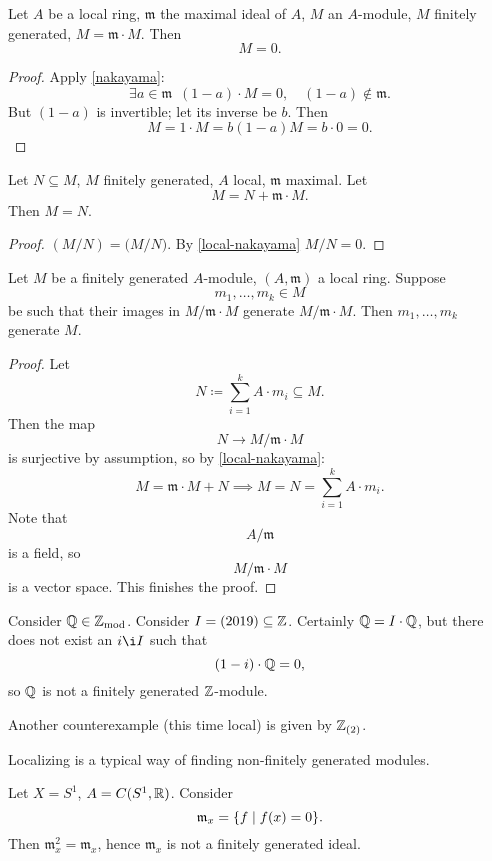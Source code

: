 \begin{corollary}
  \label{local-nakayama}
  Let $A$ be a local ring, $\mathfrak m$ the maximal ideal of $A$, $M$ an $A$-module, $M$ finitely generated, $M = \mathfrak m \cdot M$. Then
  \[ M = 0.\]
\end{corollary}
\begin{proof}
  Apply \cref{nakayama}:
  \[ \exists a \in \mathfrak m \enspace (1-a) \cdot M = 0, \quad (1-a) \notin \mathfrak m.\]
  But $(1 - a)$ is invertible; let its inverse be $b$. Then
  \[ M = 1 \cdot M = b(1-a) M = b \cdot 0 = 0.\]
\end{proof}

\begin{corollary}
  \label{local-nakayama2}
  Let $N \subseteq M$, $M$ finitely generated, $A$ local, $\mathfrak m$ maximal. Let
  \[ M = N + \mathfrak m \cdot M.\]
  Then $M = N$.
\end{corollary}
\begin{proof}
  $(M / {N}) = \mathfrak (M / {N})$.
  By \cref{local-nakayama}
  $M / {N} = 0$.
\end{proof}

\begin{corollary}
  Let $M$ be a finitely generated $A$-module, $(A, \mathfrak m)$ a local ring. Suppose
  \[ m_1, \dotsc, m_k \in M\]
  be such that their images in $M / {\mathfrak m \cdot M}$ generate $M / {\mathfrak m \cdot M}$. Then $m_1, \dotsc, m_k$ generate $M$.
\end{corollary}
\begin{proof}
  Let
  \[ N \coloneqq \sum_{i=1}^k A \cdot m_i \subseteq M.\]
  Then the map
  \[ N \to M / {\mathfrak m \cdot M}\]
  is surjective by assumption, so by \cref{local-nakayama}:
  \[ M = \mathfrak m \cdot M + N \implies M = N = \sum_{i=1}^k A \cdot m_i.\]
  Note that
  \[ A / {\mathfrak m}\]
  is a field, so
  \[ M / {\mathfrak m \cdot M}\]
  is a vector space. This finishes the proof.
\end{proof}

\begin{example}
  Consider $\mathbb Q \in \mathbb Z_\text{mod}$. Consider $I = (2019) \subseteq \mathbb Z$.
  Certainly $\mathbb Q = I \cdot \mathbb Q$, but there does not exist an $i \i I$ such that
  \[ (1-i) \cdot \mathbb Q = 0,\]
  so $\mathbb Q$ is not a finitely generated $\mathbb Z$-module. 
\end{example}

\begin{example}
  Another counterexample (this time local) is given by $\mathbb Z_{(2)}$.
\end{example}

\begin{note}
  Localizing is a typical way of finding non-finitely generated modules.
\end{note}

\begin{example}
  Let $X = S^1$, $A = C(S^1, \mathbb R)$. Consider
  \[ \mathfrak m_x = \{ f \mathrel{|} f(x) = 0 \}. \]
  Then $\mathfrak m_x^2 = \mathfrak m_x$, hence $\mathfrak m_x$ is not a finitely generated ideal.
\end{example}


